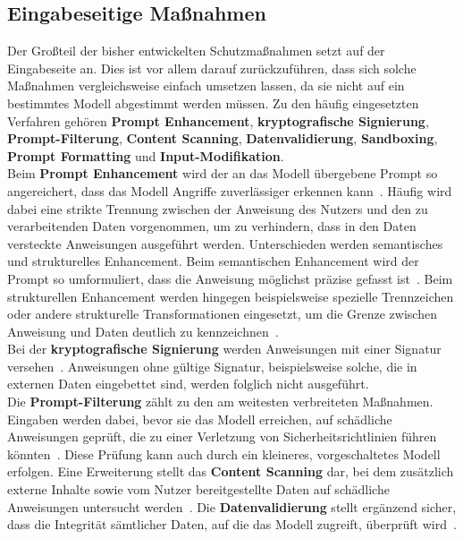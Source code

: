 \subsection{Eingabeseitige Maßnahmen}

Der Großteil der bisher entwickelten Schutzmaßnahmen setzt auf der Eingabeseite an. Dies ist vor allem darauf zurückzuführen, dass sich solche Maßnahmen vergleichsweise
einfach umsetzen lassen, da sie nicht auf ein bestimmtes Modell abgestimmt werden müssen. Zu den häufig eingesetzten Verfahren gehören \textbf{Prompt Enhancement}, 
\textbf{kryptografische Signierung}, \textbf{Prompt-Filterung}, \textbf{Content Scanning}, \textbf{Datenvalidierung}, \textbf{Sandboxing}, 
\textbf{Prompt Formatting} und \textbf{Input-Modifikation}. \\
Beim \textbf{Prompt Enhancement} wird der an das Modell übergebene Prompt so angereichert, dass das Modell Angriffe zuverlässiger erkennen kann~\cite[7]{sm09}. Häufig wird
dabei eine strikte Trennung zwischen der Anweisung des Nutzers und den zu verarbeitenden Daten vorgenommen, um zu verhindern, dass in den Daten versteckte Anweisungen
ausgeführt werden. Unterschieden werden semantisches und strukturelles Enhancement. Beim semantischen Enhancement wird der Prompt so umformuliert, dass die Anweisung
möglichst präzise gefasst ist~\cite[55]{sm11}. Beim strukturellen Enhancement werden hingegen beispielsweise spezielle Trennzeichen oder andere strukturelle
Transformationen eingesetzt, um die Grenze zwischen Anweisung und Daten deutlich zu kennzeichnen~\cite[7]{sm09}\cite[55]{sm11}. \\
Bei der \textbf{kryptografische Signierung} werden Anweisungen mit einer Signatur versehen~\cite[4]{pi9}. Anweisungen ohne gültige Signatur, beispielsweise solche, die in externen
Daten eingebettet sind, werden folglich nicht ausgeführt. \\
Die \textbf{Prompt-Filterung} zählt zu den am weitesten verbreiteten Maßnahmen. Eingaben werden dabei, bevor sie das Modell erreichen, auf schädliche Anweisungen geprüft, die zu
einer Verletzung von Sicherheitsrichtlinien führen könnten~\cite{sm04}. Diese Prüfung kann auch durch ein kleineres, vorgeschaltetes Modell erfolgen. Eine Erweiterung
stellt das \textbf{Content Scanning} dar, bei dem zusätzlich externe Inhalte sowie vom Nutzer bereitgestellte Daten auf schädliche Anweisungen untersucht werden~\cite{sm04}.
Die \textbf{Datenvalidierung} stellt ergänzend sicher, dass die Integrität sämtlicher Daten, auf die das Modell zugreift, überprüft wird~\cite{sm04}. \\
